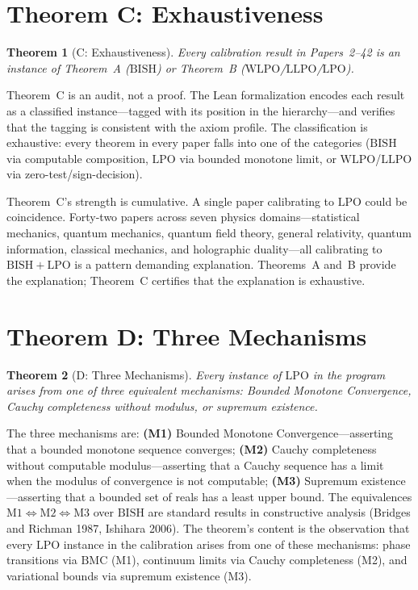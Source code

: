 \documentclass[11pt,a4paper]{report}
\theoremstyle{plain}
\newtheorem{theorem}{Theorem}[chapter]
\theoremstyle{definition}
\theoremstyle{remark}
\newcommand{\BISH}{\mathrm{BISH}}
\newcommand{\LLPO}{\mathrm{LLPO}}
\newcommand{\WLPO}{\mathrm{WLPO}}
\newcommand{\LPO}{\mathrm{LPO}}
\newcommand{\BMC}{\mathrm{BMC}}
\begin{document}
\section{Theorem C: Exhaustiveness}

\begin{theorem}[C: Exhaustiveness]
Every calibration result in Papers~2--42 is an instance of Theorem~A ($\BISH$) or Theorem~B ($\WLPO$/$\LLPO$/$\LPO$).
\end{theorem}

Theorem~C is an audit, not a proof. The Lean formalization encodes each result as a classified instance---tagged with its position in the hierarchy---and verifies that the tagging is consistent with the axiom profile. The classification is exhaustive: every theorem in every paper falls into one of the categories ($\BISH$ via computable composition, $\LPO$ via bounded monotone limit, or $\WLPO$/$\LLPO$ via zero-test/sign-decision).

Theorem~C's strength is cumulative. A single paper calibrating to $\LPO$ could be coincidence. Forty-two papers across seven physics domains---statistical mechanics, quantum mechanics, quantum field theory, general relativity, quantum information, classical mechanics, and holographic duality---all calibrating to $\BISH+\LPO$ is a pattern demanding explanation. Theorems~A and~B provide the explanation; Theorem~C certifies that the explanation is exhaustive.

\section{Theorem D: Three Mechanisms}

\begin{theorem}[D: Three Mechanisms]
Every instance of $\LPO$ in the program arises from one of three equivalent mechanisms: Bounded Monotone Convergence, Cauchy completeness without modulus, or supremum existence.
\end{theorem}

The three mechanisms are: \textbf{(M1)} Bounded Monotone Convergence---asserting that a bounded monotone sequence converges; \textbf{(M2)} Cauchy completeness without computable modulus---asserting that a Cauchy sequence has a limit when the modulus of convergence is not computable; \textbf{(M3)} Supremum existence---asserting that a bounded set of reals has a least upper bound. The equivalences $\text{M1} \Leftrightarrow \text{M2} \Leftrightarrow \text{M3}$ over $\BISH$ are standard results in constructive analysis (Bridges and Richman 1987, Ishihara 2006). The theorem's content is the observation that every $\LPO$ instance in the calibration arises from one of these mechanisms: phase transitions via $\BMC$ (M1), continuum limits via Cauchy completeness (M2), and variational bounds via supremum existence (M3).
\end{document}
